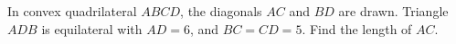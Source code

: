In convex quadrilateral $ABCD$, the diagonals $AC$ and $BD$ are drawn. Triangle $ADB$ is equilateral with $AD=6$, and $BC=CD=5$. Find the length of $AC$.
